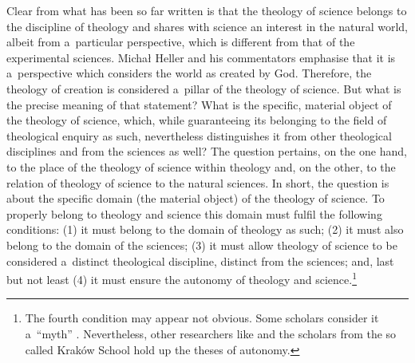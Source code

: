 Clear from what has been so far written is that the theology of science belongs to the discipline of theology and shares with science an interest in the natural world, albeit from a~particular perspective, which is different from that of the experimental sciences. Michał Heller and his commentators emphasise that it is a~perspective which considers the world as created by God. Therefore, the theology of creation is considered a~pillar of the theology of science. But what is the precise meaning of that statement? What is the specific, material object of the theology of science, which, while guaranteeing its belonging to the field of theological enquiry as such, nevertheless distinguishes it from other theological disciplines and from the sciences as well? The question pertains, on the one hand, to the place of the theology of science within theology and, on the other, to the relation of theology of science to the natural sciences. In short, the question is about the specific domain (the material object) of the theology of science. To properly belong to theology and science this domain must fulfil the following conditions: (1) it must belong to the domain of theology as such; (2) it must also belong to the domain of the sciences; (3) it must allow theology of science to be considered a~distinct theological discipline, distinct from the sciences; and, last but not least (4) it must ensure the autonomy of theology and science.\footnote{The fourth condition may appear not obvious. Some scholars consider it a~``myth'' 
\parencite[as][chap.9.1.]{}. %
 Nevertheless, other researchers like 
\parencite[][]{lococo_life_2021} %
 and the scholars from the so called Kraków School 
\parencites[][]{obolevitch_relationship_2015}[][]{polak_teologia_2015}[see also][]{macek_teologia_2014} %
 hold up the theses of autonomy.}




